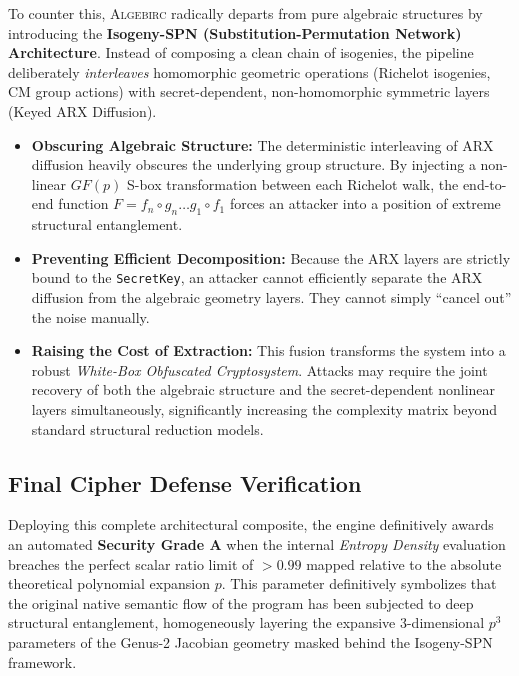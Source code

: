 To counter this, \textsc{Algebirc} radically departs from pure algebraic structures by introducing the \textbf{Isogeny-SPN (Substitution-Permutation Network) Architecture}. Instead of composing a clean chain of isogenies, the pipeline deliberately \textit{interleaves} homomorphic geometric operations (Richelot isogenies, CM group actions) with secret-dependent, non-homomorphic symmetric layers (Keyed ARX Diffusion). 

\begin{itemize}
    \item \textbf{Obscuring Algebraic Structure:} The deterministic interleaving of ARX diffusion heavily obscures the underlying group structure. By injecting a non-linear $GF(p)$ S-box transformation between each Richelot walk, the end-to-end function $F = f_n \circ g_n \dots g_1 \circ f_1$ forces an attacker into a position of extreme structural entanglement.
    \item \textbf{Preventing Efficient Decomposition:} Because the ARX layers are strictly bound to the \texttt{SecretKey}, an attacker cannot efficiently separate the ARX diffusion from the algebraic geometry layers. They cannot simply ``cancel out'' the noise manually.
    \item \textbf{Raising the Cost of Extraction:} This fusion transforms the system into a robust \textit{White-Box Obfuscated Cryptosystem}. Attacks may require the joint recovery of both the algebraic structure and the secret-dependent nonlinear layers simultaneously, significantly increasing the complexity matrix beyond standard structural reduction models.
\end{itemize}

\subsection{Final Cipher Defense Verification}
Deploying this complete architectural composite, the engine definitively awards an automated \textbf{Security Grade A} when the internal \textit{Entropy Density} evaluation breaches the perfect scalar ratio limit of $ > 0.99$ mapped relative to the absolute theoretical polynomial expansion $p$. This parameter definitively symbolizes that the original native semantic flow of the program has been subjected to deep structural entanglement, homogeneously layering the expansive 3-dimensional $p^3$ parameters of the Genus-2 Jacobian geometry masked behind the Isogeny-SPN framework.
